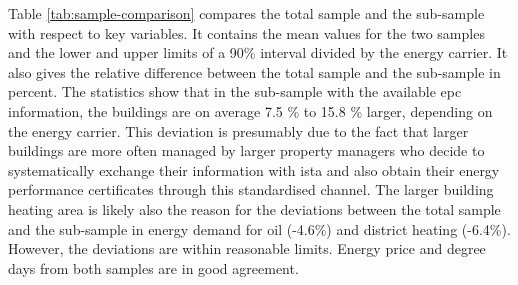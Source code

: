 \documentclass[12pt,twoside]{reedthesis}
\begin{document}
\noindent
Table \ref{tab:sample-comparison} compares the total sample and the sub-sample with respect to key variables. It contains the mean values for the two samples and the lower and upper limits of a 90\% interval divided by the energy carrier. It also gives the relative difference between the total sample and the sub-sample in percent. The statistics show that in the sub-sample with the available epc information, the buildings are on average 7.5 \% to 15.8 \% larger, depending on the energy carrier. This deviation is presumably due to the fact that larger buildings are more often managed by larger property managers who decide to systematically exchange their information with ista and also obtain their energy performance certificates through this standardised channel. The larger building heating area is likely also the reason for the deviations between the total sample and the sub-sample in energy demand for oil (-4.6\%) and district heating (-6.4\%). However, the deviations are within reasonable limits. Energy price and degree days from both samples are in good agreement.
\end{document}
